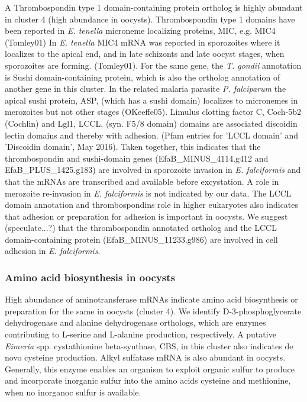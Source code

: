 \documentclass{bmcart}
\begin{document}
A Thrombospondin type 1 domain-containing protein ortholog is highly abundant in cluster 4 (high 
abundance in oocysts). Thrombospondin type 1 domains have been reported in \textit{E. tenella} microneme
localizing proteins, MIC, e.g. MIC4 (Tomley01) In \textit{E. tenella} MIC4 mRNA was reported in 
sporozoites where it localizes to the apical end, and in late schizonts and late oocyst stages,
when sporozoites are forming. (Tomley01). For the same gene, the \textit{T. gondii} annotation is 
Sushi domain-containing protein, which is also the ortholog annotation of another gene in this 
cluster. In the related malaria parasite \textit{P. falciparum} the apical sushi 
protein, ASP, (which has a sushi domain) localizes to micronemes in merozoites but not 
other stages (OKeeffe05). 
Limulus clotting factor C, Coch-5b2 (Cochlin) and Lgl1, LCCL, 
(syn. F5/8 domain) domains are associated discoidin lectin domains and thereby with adhesion.
(Pfam entries for 'LCCL domain' and 'Discoidin domain', May 2016). 
Taken together, this indicates that the thrombospondin and sushi-domain genes 
(EfaB\_MINUS\_4114.g412 and EfaB\_PLUS\_1425.g183) are involved in sporozoite invasion in 
\textit{E. falciformis} and that the mRNAs are transcribed and available before excystation. 
A role in merozoite re-invasion in \textit{E. falciformis} is not indicated by our data.
The LCCL domain annotation and thrombospondins role in higher eukaryotes also indicates 
that adhesion or preparation for adhesion is important in oocysts. 
We suggest (speculate...?) that the thrombospondin annotated ortholog and the LCCL domain-containing protein 
(EfaB\_MINUS\_11233.g986) are involved in cell adhesion in \textit{E. falciformis}.

\subsubsection*{Amino acid biosynthesis in oocysts}
High abundance of aminotransferase mRNAs indicate amino acid biosynthesis or preparation for 
the same in oocysts (cluster 4). 
We identify D-3-phosphoglycerate dehydrogenase and alanine dehydrogenase orthologs, which 
are enzymes contributing to L-serine and L-alanine production, respectively. A putative 
\textit{Eimeria} spp. cystathionine beta-synthase, CBS, in this cluster also indicates 
de novo cysteine production. Alkyl sulfatase mRNA is also abundant in oocysts. Generally, 
this enzyme enables an organism to exploit organic sulfur to produce and incorporate 
inorganic sulfur into the amino acids cysteine and methionine, when no inorganoc sulfur 
is available. 
\end{document}
